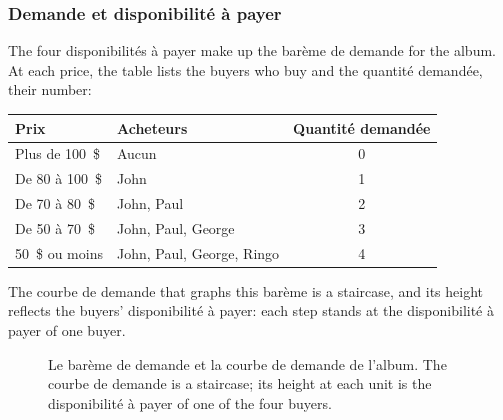 \subsubsection{Demande et disponibilité à payer}

The four disponibilités à payer make up the barème de demande for the album. At each
price, the table lists the buyers who buy and the quantité demandée, their number:
\begin{center}
  \begin{tabular}{@{}llc@{}}
    \toprule
    Prix & Acheteurs & Quantité demandée \\
    \midrule
    Plus de 100~\$ & Aucun & 0 \\
    De 80 à 100~\$ & John & 1 \\
    De 70 à 80~\$ & John, Paul & 2 \\
    De 50 à 70~\$ & John, Paul, George & 3 \\
    50~\$ ou moins & John, Paul, George, Ringo & 4 \\
    \bottomrule
  \end{tabular}
\end{center}
The courbe de demande that graphs this barème is a staircase, and its height
reflects the buyers' disponibilité à payer: each step stands at the disponibilité à
payer of one buyer.\\

\begin{figure}[h!]
  \centering
  \caption*{\small Le barème de demande et la courbe de demande de l'album. The
  courbe de demande is a staircase; its height at each unit is the disponibilité à
  payer of one of the four buyers.}
\end{figure}

